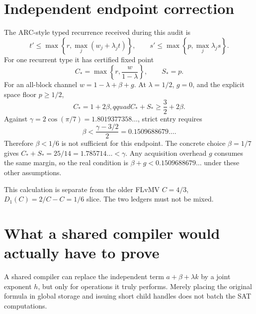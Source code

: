 \documentclass[11pt]{article}
\begin{document}
\section{Independent endpoint correction}
The ARC-style typed recurrence received during this audit is
\[
 t'\le \max\!\left\{r,\max_j(w_j+\lambda_jt)\right\},
 \qquad
 s'\le \max\!\left\{p,\max_j\lambda_js\right\}.
\]
For one recurrent type it has certified fixed point
\[
 C_* = \max\left\{r,\frac{w}{1-\lambda}\right\},
 \qquad S_*=p.
\]
For an all-block channel $w=1-\lambda+\beta+g$.  At
$\lambda=1/2$, $g=0$, and the explicit space floor $p\ge1/2$,
\[
 C_*=1+2\beta,qquad C_*+S_*\ge\frac32+2\beta.
\]
Against $\gamma=2\cos(\pi/7)=1.8019377358\ldots$, strict entry requires
\[
 \boxed{\beta<\frac{\gamma-3/2}{2}
 =0.1509688679\ldots.}
\]
Therefore $\beta<1/6$ is not sufficient for this endpoint.  The concrete
choice $\beta=1/7$ gives $C_*+S_*=25/14=1.785714\ldots<\gamma$.
Any acquisition overhead $g$ consumes the same margin, so the real condition
is $\beta+g<0.1509688679\ldots$ under these other assumptions.

This calculation is separate from the older FLvMV $C=4/3$,
$D_1(C)=2/C-C=1/6$ slice.  The two ledgers must not be mixed.

\section{What a shared compiler would actually have to prove}
A shared compiler can replace the independent term
$a+\beta+\lambda k$ by a joint exponent $h$, but only for operations it truly
performs.  Merely placing the original formula in global storage and issuing
short child handles does not batch the SAT computations.
\end{document}
